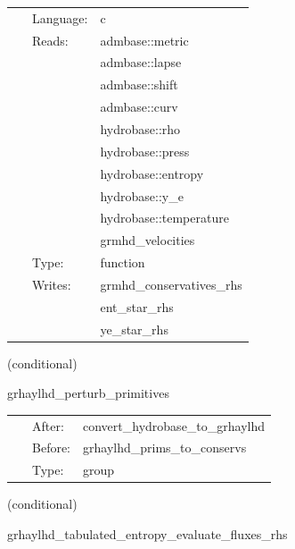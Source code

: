 \hspace{5mm}

 \begin{tabular*}{160mm}{cll} 
~ & Language:  & c \\ 
~ & Reads:  & admbase::metric \\ 
~& ~ &admbase::lapse\\ 
~& ~ &admbase::shift\\ 
~& ~ &admbase::curv\\ 
~& ~ &hydrobase::rho\\ 
~& ~ &hydrobase::press\\ 
~& ~ &hydrobase::entropy\\ 
~& ~ &hydrobase::y\_e\\ 
~& ~ &hydrobase::temperature\\ 
~& ~ &grmhd\_velocities\\ 
~ & Type:  & function \\ 
~ & Writes:  & grmhd\_conservatives\_rhs \\ 
~& ~ &ent\_star\_rhs\\ 
~& ~ &ye\_star\_rhs\\ 
\end{tabular*} 


\vspace{5mm}

   (conditional) 

\hspace{5mm} grhaylhd\_perturb\_primitives 

\hspace{5mm}{\it perturb initial primitive data } 


\hspace{5mm}

 \begin{tabular*}{160mm}{cll} 
~ & After:  & convert\_hydrobase\_to\_grhaylhd \\ 
~ & Before:  & grhaylhd\_prims\_to\_conservs \\ 
~ & Type:  & group \\ 
\end{tabular*} 


\vspace{5mm}

   (conditional) 

\hspace{5mm} grhaylhd\_tabulated\_entropy\_evaluate\_fluxes\_rhs 

\hspace{5mm}{\it entropy+tabulated version of grhaylhd\_evaluate\_fluxes\_rhs } 


